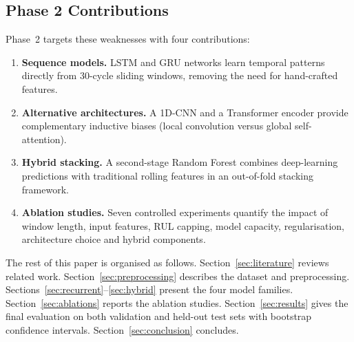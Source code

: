 \subsection{Phase 2 Contributions}
Phase~2 targets these weaknesses with four contributions:
\begin{enumerate}
  \item \textbf{Sequence models.} LSTM and GRU networks learn temporal
    patterns directly from 30-cycle sliding windows, removing the need
    for hand-crafted features.
  \item \textbf{Alternative architectures.} A 1D-CNN and a Transformer
    encoder provide complementary inductive biases (local convolution
    versus global self-attention).
  \item \textbf{Hybrid stacking.} A second-stage Random Forest combines
    deep-learning predictions with traditional rolling features in an
    out-of-fold stacking framework.
  \item \textbf{Ablation studies.} Seven controlled experiments quantify
    the impact of window length, input features, RUL capping, model
    capacity, regularisation, architecture choice and hybrid components.
\end{enumerate}

The rest of this paper is organised as follows.
Section~\ref{sec:literature} reviews related work.
Section~\ref{sec:preprocessing} describes the dataset and preprocessing.
Sections~\ref{sec:recurrent}--\ref{sec:hybrid} present the four model
families.  Section~\ref{sec:ablations} reports the ablation studies.
Section~\ref{sec:results} gives the final evaluation on both validation
and held-out test sets with bootstrap confidence intervals.
Section~\ref{sec:conclusion} concludes.
